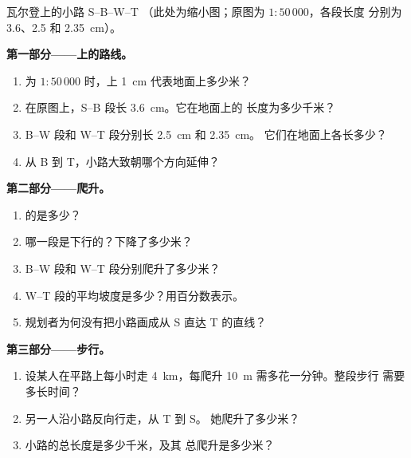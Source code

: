 \begin{problem}
\begin{omfigure}
{\small 瓦尔登上的小路 S--B--W--T
（此处为缩小图；原图为 $1 : 50\,000$，各段长度
分别为 3.6、2.5 和 \qty{2.35}{cm}）。}
\label{fig:g9:maps-of-the-earth:path}
\end{omfigure}

\noindent\textbf{第一部分——上的路线。}\par\nopagebreak
\begin{enumerate}[beginpenalty=10000]
  \item {}为 $1 : 50\,000$ 时，上 \qty{1}{cm}
        代表地面上多少米？
  \item 在原图上，S--B 段长 \qty{3.6}{cm}。它在地面上的
        长度为多少千米？
  \item B--W 段和 W--T 段分别长 \qty{2.5}{cm} 和 \qty{2.35}{cm}。
        它们在地面上各长多少？
  \item 从 B 到 T，小路大致朝哪个方向延伸？
\end{enumerate}

\noindent\textbf{第二部分——爬升。}\par\nopagebreak
\begin{enumerate}[resume, beginpenalty=10000]
  \item {}的是多少？
  \item 哪一段是下行的？下降了多少米？
  \item B--W 段和 W--T 段分别爬升了多少米？
  \item W--T 段的平均坡度是多少？用百分数表示。
  \item 规划者为何没有把小路画成从 S
        直达 T 的直线？
\end{enumerate}

\noindent\textbf{第三部分——步行。}\par\nopagebreak
\begin{enumerate}[resume, beginpenalty=10000]
  \item 设某人在平路上每小时走 \qty{4}{km}，每爬升
        \qty{10}{m} 需多花一分钟。整段步行
        需要多长时间？
  \item 另一人沿小路反向行走，从 T 到 S。
        她爬升了多少米？
  \item 小路的总长度是多少千米，及其
        总爬升是多少米？
\end{enumerate}
\end{problem}
